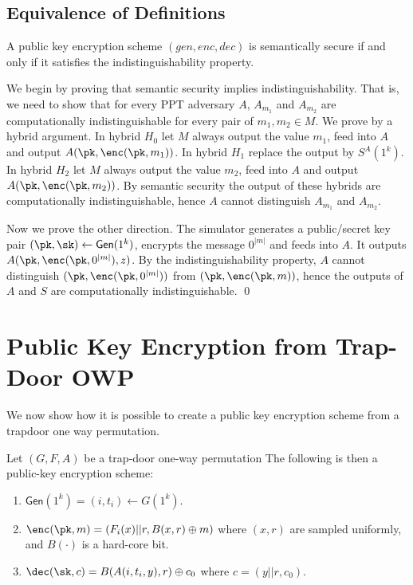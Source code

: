 \documentclass[12pt]{tufte-book}
\newcommand{\gen}{\mathsf{Gen}}
\begin{document}
\subsection{Equivalence of Definitions}

\begin{theorem}
A public key encryption scheme $(gen, enc, dec)$ is semantically secure if and only if
it satisfies the indistinguishability property.
\end{theorem}

\proof
We begin by proving that semantic security implies indistinguishability.
That is, we need to show that for every PPT adversary $A$, $A_{m_1}$ and $A_{m_2}$ are computationally indistinguishable for every pair of $m_1, m_2 \in M$.
We prove by a hybrid argument.
In hybrid $H_0$ let $M$ always output the value $m_1$, feed into $A$ and output $A(\pk, \enc(\pk, m_1))$.
In hybrid $H_1$ replace the output by $S^A(1^k)$.
In hybrid $H_2$ let $M$ always output the value $m_2$, feed into $A$ and output $A(\pk, \enc(\pk, m_2))$.
By semantic security the output of these hybrids are computationally indistinguishable, hence $A$ cannot distinguish $A_{m_1}$ and $A_{m_2}$.



Now we prove the other direction.
The simulator generates a public/secret key pair $(\pk, \sk) \gets \gen(1^k)$, encrypts the message $0^{|m|}$ and feeds into $A$.
It outputs $A(\pk, \enc(\pk, 0^{|m|}), z)$.
By the indistinguishability property, $A$ cannot distinguish $(\pk, \enc(\pk, 0^{|m|}))$ from $(\pk, \enc(\pk, m))$, hence the outputs of $A$ and $S$ are computationally indistinguishable.
 \qed


\section{Public Key Encryption from Trap-Door OWP}

We now show how it is possible to create a public key encryption scheme from a trapdoor
one way permutation.

\begin{theorem}
Let $(G,F,A)$ be a trap-door one-way permutation The following is then a public-key
encryption scheme:
\begin{enumerate}
\item $\gen(1^k) = (i,t_i) \gets G(1^k)$.
\item $\enc(\pk, m) = (F_i(x) || r, B(x, r) \oplus m)$ where $(x,r)$ are sampled uniformly, and $B(\cdot)$ is a hard-core bit.
\item $\dec(\sk, c) = B(A(i,t_i, y), r) \oplus c_0$ where $c = (y||r,c_0)$.
\end{enumerate}

\end{theorem}
\end{document}
